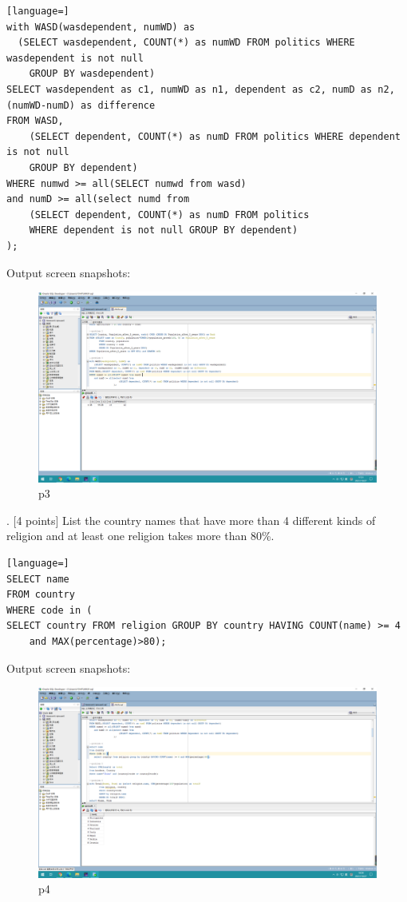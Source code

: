 \documentclass[]{article}
\begin{document}
	\begin{lstlisting}[language=] 
with WASD(wasdependent, numWD) as
  (SELECT wasdependent, COUNT(*) as numWD FROM politics WHERE wasdependent is not null 
	GROUP BY wasdependent)
SELECT wasdependent as c1, numWD as n1, dependent as c2, numD as n2, (numWD-numD) as difference
FROM WASD,
	(SELECT dependent, COUNT(*) as numD FROM politics WHERE dependent is not null 
	GROUP BY dependent)
WHERE numwd >= all(SELECT numwd from wasd) 
and numD >= all(select numd from 
	(SELECT dependent, COUNT(*) as numD FROM politics 
	WHERE dependent is not null GROUP BY dependent)
);
	\end{lstlisting} 
	Output screen snapshots:
	\begin{figure}[H]
		\centering
		\includegraphics[width=1\linewidth]{../screen/p3}
		\caption{p3}
		\label{fig:p3}
	\end{figure}
	
	. [4 points] List the country names that have more than 4 different kinds of religion and at least one religion takes more than 80\%.  \\
	
	\begin{lstlisting}[language=] 
SELECT name
FROM country
WHERE code in (
SELECT country FROM religion GROUP BY country HAVING COUNT(name) >= 4 
	and MAX(percentage)>80);
	\end{lstlisting} 
	Output screen snapshots:
	\begin{figure}[H]
		\centering
		\includegraphics[width=0.8\linewidth]{../screen/p4}
		\caption{p4}
		\label{fig:p4}
	\end{figure}
	
\end{document}
